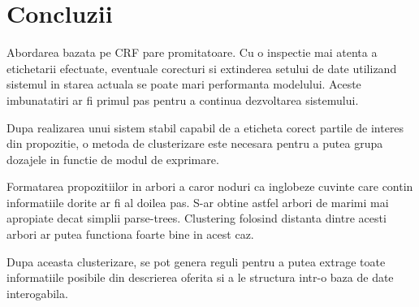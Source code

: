 \documentclass[a4paper,12pt]{article}
\begin{document}
\clearpage
\section{Concluzii}

 Abordarea bazata pe CRF pare promitatoare. Cu o inspectie mai atenta a etichetarii efectuate, eventuale corecturi si extinderea setului de date utilizand sistemul in starea actuala se poate mari performanta modelului. Aceste imbunatatiri ar fi primul pas pentru a continua dezvoltarea sistemului.
 
 Dupa realizarea unui sistem stabil capabil de a eticheta corect partile de interes din propozitie, o metoda de clusterizare este necesara pentru a putea grupa dozajele in functie de modul de exprimare. 
 
 Formatarea propozitiilor in arbori a caror noduri ca inglobeze cuvinte care contin informatiile dorite ar fi al doilea pas. S-ar obtine astfel arbori de marimi mai apropiate decat simplii parse-trees. Clustering folosind distanta dintre acesti arbori ar putea functiona foarte bine in acest caz. 
 
 Dupa aceasta clusterizare, se pot genera reguli pentru a putea extrage toate informatiile posibile din descrierea oferita si a le structura intr-o baza de date interogabila.
\end{document}
